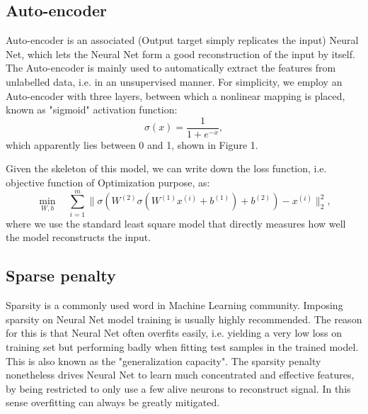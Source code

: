 \documentclass{article} %
\begin{document}
\subsection{Auto-encoder}
Auto-encoder is an associated (Output target simply replicates the input) Neural Net, which lets the Neural Net form a good reconstruction of the input by itself. The Auto-encoder is mainly used to automatically extract the features from unlabelled data, i.e. in an unsupervised manner. For simplicity, we employ an Auto-encoder with three layers, between which a nonlinear mapping is placed, known as "sigmoid" activation function:
$$
\sigma(x) = \frac{1}{1+e^{-x}},
$$
which apparently lies between 0 and 1, shown in Figure 1.

Given the skeleton of this model, we can write down the loss function, i.e. objective function of Optimization purpose, as:
$$
\min_{W, b} \quad \sum_{i=1}^m \| \sigma( W^{(2)} \sigma( W^{(1)} x^{(i)}+b^{(1)} )+b^{(2)} )-x^{(i)} \|_2^2,
$$
where we use the standard least square model that directly measures how well the model reconstructs the input. %


\subsection{Sparse penalty}
Sparsity is a commonly used word in Machine Learning community. Imposing sparsity on Neural Net model training is usually highly recommended. The reason for this is that Neural Net often overfits easily, i.e. yielding a very low loss on training set but performing badly when fitting test samples in the trained model. This is also known as the "generalization capacity". The sparsity penalty nonetheless drives Neural Net to learn much concentrated and effective features, by being restricted to only use a few alive neurons to reconstruct signal. In this sense overfitting can always be greatly mitigated.
\end{document}
